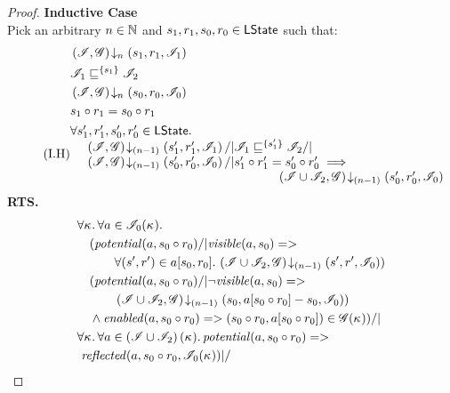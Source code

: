 \begin{lemma}
\begin{proof}
\noindent\textbf{Inductive Case}\\
Pick an arbitrary $n \in \mathbb{N}$ and $s_1, r_1, s_0, r_0 \in \textsf{LState}$ such that:
\begin{align}
	&\extendsAMUpto{\lmod, \gmod}{n}{s_1}{r_1}{\lmod_1} \label{LSC2:Ass1}\\
	&\lmod_1 \weakenI{\{s_1\}} \lmod_2 \label{LSC2:Ass2}\\
	& \extendsAMUpto{\lmod, \gmod}{n}{s_0}{r_0}{\lmod_0} \label{LSC2:Ass3}\\
	& s_1 \composeL r_1 = s_0 \composeL r_1 \label{LSC2:Ass4}\\
	\tag{I.H}	
	&\begin{array}{@{} l @{\hspace{-3cm}} l @{\hspace*{-2cm}} l @{}}
		\for{s'_1, r'_1, s'_0, r'_0 \in \LStates} &&\\
		& \extendsAMUpto{\lmod, \gmod}{(n-1)}{s'_1}{r'_1}{\lmod_1} /| \lmod_1 \weakenI{\{s'_1\}} \lmod_2 /| & \\
		& \extendsAMUpto{\lmod, \gmod}{(n-1)}{s'_0}{r'_0}{\lmod_0} /| s'_1 \composeL r'_1 = s'_0 \composeL r'_0 \implies & \\
		&& \extendsAMUpto{\lmod \cup \lmod_2, \gmod}{(n-1)}{s'_0}{r'_0}{\lmod_0}
	\end{array} \label{LSC2:IH}
\end{align}
%
\textbf{RTS. } 
%
\begin{align}
	& 
	\V{\ca{}}  \V{a\in \lmod_0(\ca{})} \nonumber \\
  &\quad (\m{potential}(a,s_0 \composeL r_0) /| \m{visible}(a, s_0) => \nonumber\\
  & \quad\qquad\for{(s', r') \in a[s_0, r_0]} \extendsAMUpto{\lmod \cup \lmod_2, \gmod}{(n-1)}{s'}{r'}{\lmod_0}) \label{LSC2:Goal0}\\
% 
	&\quad (\m{potential}(a,s_0 \composeL r_0) /| \neg\m{visible}(a, s_0) => \nonumber\\
  & \quad\qquad \extendsAMUpto{\lmod \cup \lmod_2, \gmod}{(n-1)}{s_0}{a[s_0 \composeL r_0] - s_0}{\lmod_0}) \label{LSC2:Goal1}\\
%   
  &\quad\land \m{enabled}(a,s_0 \composeL r_0)
  => (s_0 \composeL r_0, a[s_0 \composeL r_0])\in \gmod(\ca{}))
  /|\null \label{LSC2:Goal2}\\
%  
  &\V{\ca{}}\V{a\in \left(\lmod \cup \lmod_2 \right) (\ca{})}
  \m{potential}(a, s_0 \composeL r_0) =>\null \nonumber \\
  &\ \m{reflected}(a, s_0 \composeL r_0,\lmod_0(\ca{})) |/\null \nonumber \\

\end{align}
\end{proof}
\end{lemma}
